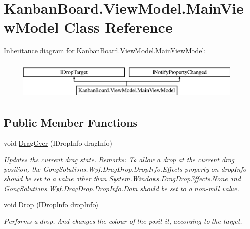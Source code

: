 \hypertarget{class_kanban_board_1_1_view_model_1_1_main_view_model}{}\section{Kanban\+Board.\+View\+Model.\+Main\+View\+Model Class Reference}
\label{class_kanban_board_1_1_view_model_1_1_main_view_model}
Inheritance diagram for Kanban\+Board.\+View\+Model.\+Main\+View\+Model\+:\begin{figure}[H]
\begin{center}
\leavevmode
\includegraphics[height=2.000000cm]{class_kanban_board_1_1_view_model_1_1_main_view_model}
\end{center}
\end{figure}
\subsection*{Public Member Functions}
\begin{DoxyCompactItemize}
\item 
void \hyperlink{class_kanban_board_1_1_view_model_1_1_main_view_model_add23d90d0faec4c4d77bb3762d0215c7}{Drag\+Over} (I\+Drop\+Info drag\+Info)
\begin{DoxyCompactList}\small\item\em Updates the current drag state. Remarks\+: To allow a drop at the current drag position, the Gong\+Solutions.\+Wpf.\+Drag\+Drop.\+Drop\+Info.\+Effects property on drop\+Info should be set to a value other than System.\+Windows.\+Drag\+Drop\+Effects.\+None and Gong\+Solutions.\+Wpf.\+Drag\+Drop.\+Drop\+Info.\+Data should be set to a non-\/null value. \end{DoxyCompactList}\item 
void \hyperlink{class_kanban_board_1_1_view_model_1_1_main_view_model_a8a289987889845510435516f3699495c}{Drop} (I\+Drop\+Info drop\+Info)
\begin{DoxyCompactList}\small\item\em Performs a drop. And changes the colour of the posit it, according to the target. \end{DoxyCompactList}\end{DoxyCompactItemize}
